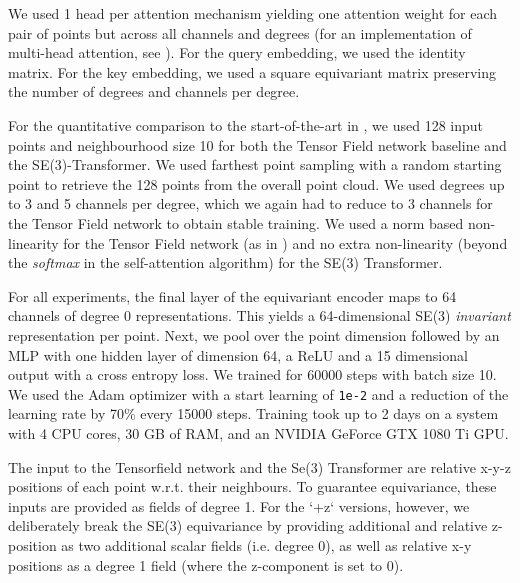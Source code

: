 We used 1 head per attention mechanism yielding one attention weight for each pair of points but across all channels and degrees (for an implementation of multi-head attention, see ). For the query embedding, we used the identity matrix. For the key embedding, we used a square equivariant matrix preserving the number of degrees and channels per degree.

For the quantitative comparison to the start-of-the-art in , we used 128 input points and neighbourhood size 10 for both the Tensor Field network baseline and the SE(3)-Transformer. We used farthest point sampling with a random starting point to retrieve the 128 points from the overall point cloud. We used degrees up to 3 and 5 channels per degree, which we again had to reduce to 3 channels  for the Tensor Field network to obtain stable training. We used a norm based non-linearity for the Tensor Field network (as in \cite{ThomasSKYKR18}) and no extra non-linearity (beyond the \textit{softmax} in the self-attention algorithm) for the SE(3) Transformer.

For all experiments, the final layer of the equivariant encoder maps to 64 channels of degree 0 representations. This yields a 64-dimensional SE(3) \textit{invariant} representation per point. Next, we pool over the point dimension followed by an MLP with one hidden layer of dimension 64, a ReLU and a 15 dimensional output with a cross entropy loss. We trained for 60000 steps with batch size 10. We used the Adam optimizer \cite{KingmaB14} with a start learning of \texttt{1e-2} and a reduction of the learning rate by 70\% every 15000 steps. Training took up to 2 days on a system with 4 CPU cores, 30 GB of RAM, and an NVIDIA GeForce GTX 1080 Ti GPU.

The input to the Tensorfield network and the Se(3) Transformer are relative x-y-z positions of each point w.r.t. their neighbours. To guarantee equivariance, these inputs are provided as fields of degree 1. For the `+z` versions, however, we deliberately break the SE(3) equivariance by providing additional and relative z-position as two additional scalar fields (i.e. degree 0), as well as relative x-y positions as a degree 1 field (where the z-component is set to 0).

